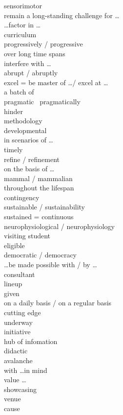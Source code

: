 \documentclass[12pt]{article}
\begin{document}
sensorimotor \\
remain a long-standing challenge for \dots \\
\dots factor in \dots \\
curriculum \\
progressively / progressive \\
over long time spans \\
interfere with \dots \\
abrupt / abruptly \\
excel = be master of \dots / excel at \dots \\
a batch of \\
pragmatic \ pragmatically \\
hinder \\
methodology \\
developmental \\
in scenarios of \dots \\
timely \\
refine / refinement \\
on the basis of \dots \\
mammal / mammalian \\
throughout the lifespan \\
contingency \\
sustainable / sustainability \\
sustained = continuous \\
neurophysiological / neurophysiology \\
visiting student \\
eligible \\
democratic / democracy \\
\dots be made possible with / by \dots \\
consultant \\
lineup \\
given \\
on a daily basis / on a regular basis \\
cutting edge \\
underway \\
initiative \\
hub of infomation \\
didactic \\
avalanche \\
with \dots in mind \\
value \dots \\
showcasing \\
venue \\
cause \\
\end{document}
